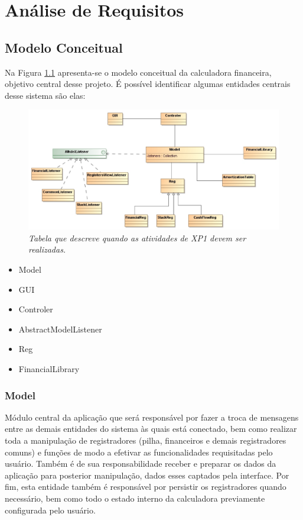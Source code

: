 \chapter{Análise de Requisitos}

\section{Modelo Conceitual}


Na Figura \ref{tab:modeConc} apresenta-se o modelo conceitual da calculadora financeira, objetivo central desse projeto. É possível identificar algumas entidades centrais desse sistema são elas:

\begin{figure}[!h]
 \includegraphics[scale=0.5]{CalcDC.eps}
 \caption{\it Tabela que descreve quando as atividades de XP1 devem ser realizadas.} \label{tab:modeConc}
\end{figure}

\begin{itemize}
	\item Model
	\item GUI
	\item Controler
	\item AbstractModelListener
	\item Reg
	\item FinancialLibrary
\end{itemize}

\subsection{Model}
Módulo central da aplicação que será responsável por fazer a troca de mensagens entre as demais entidades do sistema às quais está conectado, bem como realizar toda a manipulação de registradores (pilha, financeiros e demais registradores comuns) e funções de modo a efetivar as funcionalidades requisitadas pelo usuário. Também é de sua responsabilidade receber e preparar os dados da aplicação para posterior manipulação, dados esses captados pela interface. Por fim, esta entidade também é responsável por persistir os registradores quando necessário, bem como todo o estado interno da calculadora previamente configurada pelo usuário.

